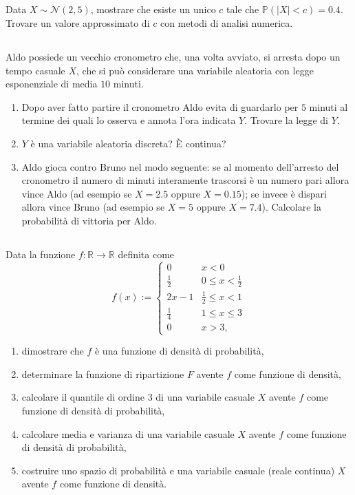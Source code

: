 \subsection{}

Data $X\sim \mathcal{N}( 2,5)$, mostrare che esiste un unico $c$ tale che $\mathbb{P}(| X| < c) =0.4$. Trovare un valore approssimato di $c$ con metodi di analisi numerica.
\subsection{}

Aldo possiede un vecchio cronometro che, una volta avviato, si arresta dopo un tempo casuale $X$, che si può considerare una variabile aleatoria con legge esponenziale di media $10$ minuti.
\begin{enumerate}
\item Dopo aver fatto partire il cronometro Aldo evita di guardarlo per $5$ minuti al termine dei quali lo osserva e annota l'ora indicata $Y$. Trovare la legge di $Y$.
\item $Y$ è una variabile aleatoria discreta? È continua?
\item Aldo gioca contro Bruno nel modo seguente: se al momento dell'arresto del cronometro il numero di minuti interamente trascorsi è un numero pari allora vince Aldo (ad esempio se $X=2.5$ oppure $X=0.15$); se invece è dispari allora vince Bruno (ad esempio se $X=5$ oppure $X=7.4$). Calcolare la probabilità di vittoria per Aldo.
\end{enumerate}
\subsection{}

Data la funzione $f:\mathbb{R}\rightarrow \mathbb{R}$ definita come
\begin{equation*}
f( x) :=\begin{cases}
0 & x< 0\\
\frac{1}{2} & 0\leq x< \frac{1}{2}\\
2x-1 & \frac{1}{2} \leq x< 1\\
\frac{1}{4} & 1\leq x\leq 3\\
0 & x >3,
\end{cases}
\end{equation*}
\begin{enumerate}
\item dimostrare che $f$ è una funzione di densità di probabilità,
\item determinare la funzione di ripartizione $F$ avente $f$ come funzione di densità,
\item calcolare il quantile di ordine $3$ di una variabile casuale $X$ avente $f$ come funzione di densità di probabilità,
\item calcolare media e varianza di una variabile casuale $X$ avente $f$ come funzione di densità di probabilità,
\item costruire uno spazio di probabilità e una variabile casuale (reale continua) $X$ avente $f$ come funzione di densità.
\end{enumerate}


